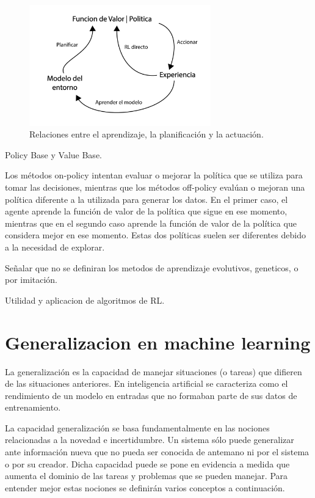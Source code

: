 \begin{figure}[ht!]
    \centering
    \includegraphics[width=0.7\textwidth]{Graphics/rl-strategies.png}
    \caption{Relaciones entre el aprendizaje, la planificación y la actuación.}
    \label{fig:rl-strategies}
\end{figure}


Policy Base y Value Base.

Los métodos on-policy intentan evaluar o mejorar la política que se utiliza para tomar las decisiones, mientras que los métodos off-policy evalúan o mejoran una política diferente a la utilizada para generar los datos. En el primer caso, el agente aprende la función de valor de la política que sigue en ese momento, mientras que en el segundo caso aprende la función de valor de la política que considera mejor en ese momento. Estas dos políticas suelen ser diferentes debido a la necesidad de explorar. 


Señalar que no se definiran los metodos de aprendizaje evolutivos, geneticos, o por imitación.

Utilidad y aplicacion de algoritmos de RL.

\section{Generalizacion en machine learning}\label{section:state-of-the-art:generalization-on-machine-learning}

La generalización es la capacidad de manejar situaciones (o tareas) que difieren de las situaciones anteriores. En inteligencia artificial se caracteriza como el rendimiento de un modelo en entradas que no formaban parte de sus datos de entrenamiento.

La capacidad generalización se basa fundamentalmente en las nociones relacionadas a la novedad e incertidumbre. Un sistema sólo puede generalizar ante información nueva que no pueda ser conocida de antemano ni por el sistema o por su creador. Dicha capacidad puede se pone en evidencia a medida que aumenta el dominio de las tareas y problemas que se pueden manejar. Para entender mejor estas nociones se definirán varios conceptos a continuación.

